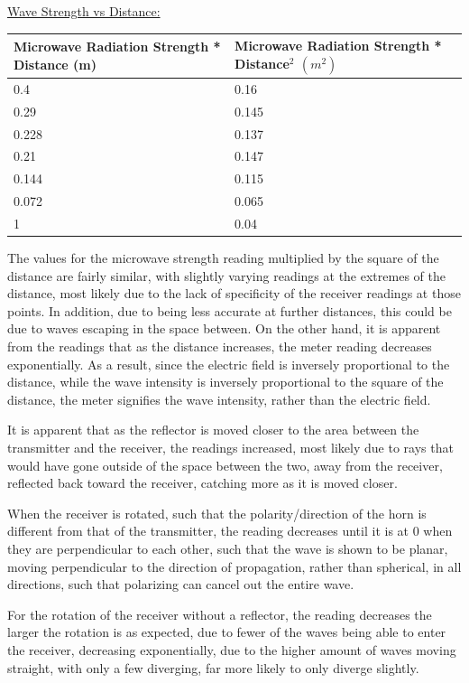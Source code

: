 \documentclass[11pt, titlepage]{article}
\begin{document}
\underline{Wave Strength vs Distance:}
\begin{center}
\begin{tabular}
{|m{15em}|m{15em}|}
\hline
Microwave Radiation Strength * Distance (m) & Microwave Radiation Strength * Distance$^2$ $(m^2)$ \\
\hline
0.4 & 0.16\\
\hline
0.29 & 0.145\\
\hline
0.228 & 0.137\\
\hline
0.21 & 0.147\\
\hline
0.144 & 0.115\\
\hline
0.072 & 0.065\\
\hline
1 & 0.04\\
\hline
\end{tabular}
\end{center}

The values for the microwave strength reading multiplied by the square of the distance are fairly similar, with slightly varying readings at the extremes of the distance, most likely due to the lack of specificity of the receiver readings at those points. In addition, due to being less accurate at further distances, this could be due to waves escaping in the space between. On the other hand, it is apparent from the readings that as the distance increases, the meter reading decreases exponentially. As a result, since the electric field is inversely proportional to the distance, while the wave intensity is inversely proportional to the square of the distance, the meter signifies the wave intensity, rather than the electric field.

It is apparent that as the reflector is moved closer to the area between the transmitter and the receiver, the readings increased, most likely due to rays that would have gone outside of the space between the two, away from the receiver, reflected back toward the receiver, catching more as it is moved closer.

When the receiver is rotated, such that the polarity/direction of the horn is different from that of the transmitter, the reading decreases until it is at 0 when they are perpendicular to each other, such that the wave is shown to be planar, moving perpendicular to the direction of propagation, rather than spherical, in all directions, such that polarizing can cancel out the entire wave.

For the rotation of the receiver without a reflector, the reading decreases the larger the rotation is as expected, due to fewer of the waves being able to enter the receiver, decreasing exponentially, due to the higher amount of waves moving straight, with only a few diverging, far more likely to only diverge slightly.
\end{document}
